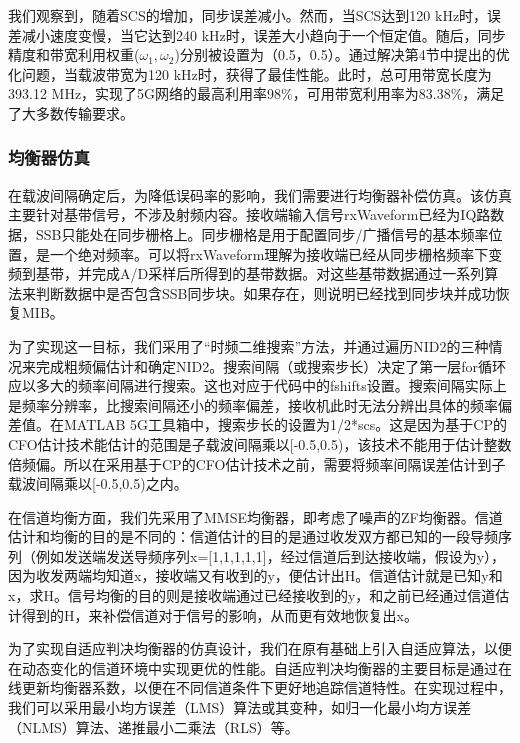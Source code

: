 \documentclass[UTF8,a4paper,12pt]{ctexart}
\numberwithin{equation}{section}
\begin{document}
我们观察到，随着SCS的增加，同步误差减小。然而，当SCS达到120 kHz时，误差减小速度变慢，当它达到240 kHz时，误差大小趋向于一个恒定值。随后，同步精度和带宽利用权重($\omega_1,\omega_2$)分别被设置为（0.5，0.5）。通过解决第4节中提出的优化问题，当载波带宽为120 kHz时，获得了最佳性能。此时，总可用带宽长度为393.12 MHz，实现了5G网络的最高利用率98\%，可用带宽利用率为83.38\%，满足了大多数传输要求。
\subsubsection{均衡器仿真}
在载波间隔确定后，为降低误码率的影响，我们需要进行均衡器补偿仿真。该仿真主要针对基带信号，不涉及射频内容。接收端输入信号rxWaveform已经为IQ路数据，SSB只能处在同步栅格上。同步栅格是用于配置同步/广播信号的基本频率位置，是一个绝对频率。可以将rxWaveform理解为接收端已经从同步栅格频率下变频到基带，并完成A/D采样后所得到的基带数据。对这些基带数据通过一系列算法来判断数据中是否包含SSB同步块。如果存在，则说明已经找到同步块并成功恢复MIB。

为了实现这一目标，我们采用了“时频二维搜索”方法，并通过遍历NID2的三种情况来完成粗频偏估计和确定NID2。搜索间隔（或搜索步长）决定了第一层for循环应以多大的频率间隔进行搜索。这也对应于代码中的fshifts设置。搜索间隔实际上是频率分辨率，比搜索间隔还小的频率偏差，接收机此时无法分辨出具体的频率偏差值。在MATLAB 5G工具箱中，搜索步长的设置为1/2*scs。这是因为基于CP的CFO估计技术能估计的范围是子载波间隔乘以[-0.5,0.5)，该技术不能用于估计整数倍频偏。所以在采用基于CP的CFO估计技术之前，需要将频率间隔误差估计到子载波间隔乘以[-0.5,0.5)之内。

在信道均衡方面，我们先采用了MMSE均衡器，即考虑了噪声的ZF均衡器。信道估计和均衡的目的是不同的：信道估计的目的是通过收发双方都已知的一段导频序列（例如发送端发送导频序列x=[1,1,1,1,1]，经过信道后到达接收端，假设为y），因为收发两端均知道x，接收端又有收到的y，便估计出H。信道估计就是已知y和x，求H。信号均衡的目的则是接收端通过已经接收到的y，和之前已经通过信道估计得到的H，来补偿信道对于信号的影响，从而更有效地恢复出x。

为了实现自适应判决均衡器的仿真设计，我们在原有基础上引入自适应算法，以便在动态变化的信道环境中实现更优的性能。自适应判决均衡器的主要目标是通过在线更新均衡器系数，以便在不同信道条件下更好地追踪信道特性。在实现过程中，我们可以采用最小均方误差（LMS）算法或其变种，如归一化最小均方误差（NLMS）算法、递推最小二乘法（RLS）等。
\end{document}
